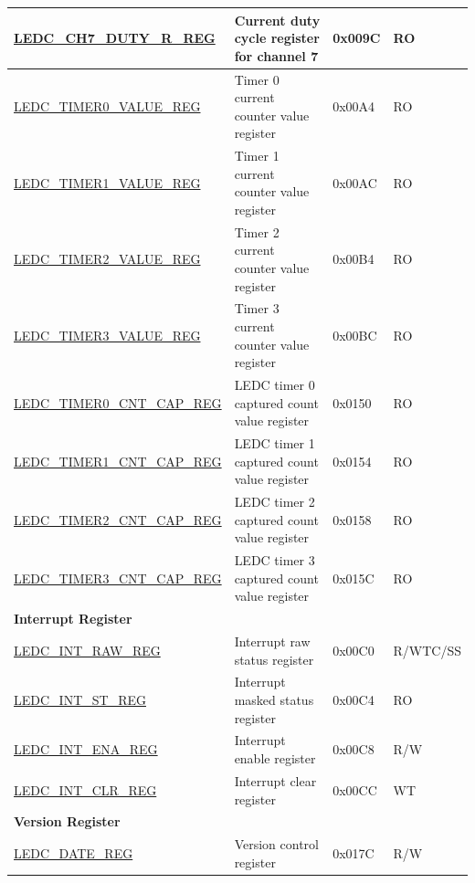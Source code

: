 \begin{longtable}{ | p{6cm} | p{7cm} | p{1.3cm} | p{1.7cm}| }
\hyperref[regdesc:LEDCCHNDUTYRREG]{LEDC\_CH7\_DUTY\_R\_REG} & Current duty cycle register for channel 7 & 0x009C & RO \\ \hline
\hyperref[regdesc:LEDCTIMERXVALUEREG]{LEDC\_TIMER0\_VALUE\_REG} & Timer 0 current counter value register & 0x00A4 & RO \\ \hline
\hyperref[regdesc:LEDCTIMERXVALUEREG]{LEDC\_TIMER1\_VALUE\_REG} & Timer 1 current counter value register & 0x00AC & RO \\ \hline
\hyperref[regdesc:LEDCTIMERXVALUEREG]{LEDC\_TIMER2\_VALUE\_REG} & Timer 2 current counter value register & 0x00B4 & RO \\ \hline
\hyperref[regdesc:LEDCTIMERXVALUEREG]{LEDC\_TIMER3\_VALUE\_REG} & Timer 3 current counter value register & 0x00BC & RO \\ \hline
\hyperref[regdesc:LEDCTIMERXCNTCAPREG]{LEDC\_TIMER0\_CNT\_CAP\_REG} & LEDC timer 0 captured count value register & 0x0150 & RO \\ \hline
\hyperref[regdesc:LEDCTIMERXCNTCAPREG]{LEDC\_TIMER1\_CNT\_CAP\_REG} & LEDC timer 1 captured count value register & 0x0154 & RO \\ \hline
\hyperref[regdesc:LEDCTIMERXCNTCAPREG]{LEDC\_TIMER2\_CNT\_CAP\_REG} & LEDC timer 2 captured count value register & 0x0158 & RO \\ \hline
\hyperref[regdesc:LEDCTIMERXCNTCAPREG]{LEDC\_TIMER3\_CNT\_CAP\_REG} & LEDC timer 3 captured count value register & 0x015C & RO \\ \hline
\multicolumn{4}{|l|}{\textbf{Interrupt Register}} \\ \hline
\hyperref[regdesc:LEDCINTRAWREG]{LEDC\_INT\_RAW\_REG} & Interrupt raw status register & 0x00C0 & R/WTC/SS \\ \hline
\hyperref[regdesc:LEDCINTSTREG]{LEDC\_INT\_ST\_REG} & Interrupt masked status register & 0x00C4 & RO \\ \hline
\hyperref[regdesc:LEDCINTENAREG]{LEDC\_INT\_ENA\_REG} & Interrupt enable register & 0x00C8 & R/W \\ \hline
\hyperref[regdesc:LEDCINTCLRREG]{LEDC\_INT\_CLR\_REG} & Interrupt clear register & 0x00CC & WT \\ \hline
\multicolumn{4}{|l|}{\textbf{Version Register}} \\ \hline
\hyperref[regdesc:LEDCDATEREG]{LEDC\_DATE\_REG} & Version control register & 0x017C & R/W \\ \hline
\end{longtable}
